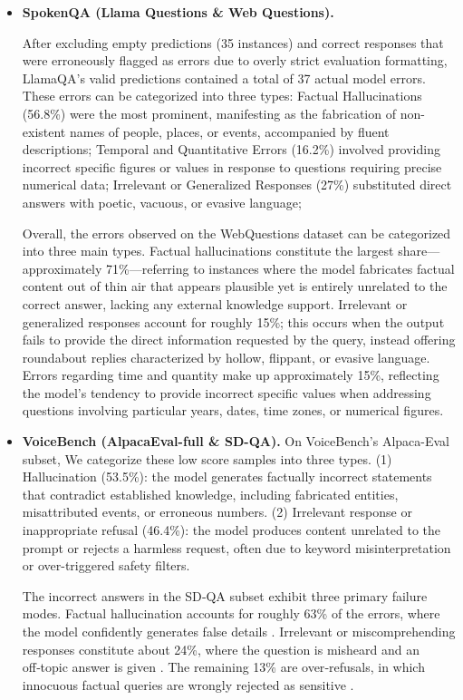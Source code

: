 \documentclass{llmxive}
\begin{document}
\begin{itemize}[leftmargin=0.5em,label=\textbullet,itemsep=0.35em,topsep=0.35em]
    \item \textbf{SpokenQA (Llama Questions \& Web Questions).}
    
  After excluding empty predictions (35 instances) and correct responses that were erroneously flagged as errors due to overly strict evaluation formatting, LlamaQA’s valid predictions contained a total of 37 actual model errors. These errors can be categorized into three types: Factual Hallucinations (56.8\%) were the most prominent, manifesting as the fabrication of non-existent names of people, places, or events, accompanied by fluent descriptions; Temporal and Quantitative Errors (16.2\%) involved providing incorrect specific figures or values in response to questions requiring precise numerical data; Irrelevant or Generalized Responses (27\%) substituted direct answers with poetic, vacuous, or evasive language; 

  Overall, the errors observed on the WebQuestions dataset can be categorized into three main types.
  Factual hallucinations constitute the largest share—approximately 71\%—referring to instances where the model fabricates factual content out of thin air that appears plausible yet is entirely unrelated to the correct answer, lacking any external knowledge support. Irrelevant or generalized responses account for roughly 15\%; this occurs when the output fails to provide the direct information requested by the query, instead offering roundabout replies characterized by hollow, flippant, or evasive language. Errors regarding time and quantity make up approximately 15\%, reflecting the model's tendency to provide incorrect specific values when addressing questions involving particular years, dates, time zones, or numerical figures.
   

  

    \item \textbf{VoiceBench (AlpacaEval-full \& SD-QA).}
  On VoiceBench's Alpaca-Eval subset, We categorize these low score samples into three types. (1) Hallucination (53.5\%): the model generates factually incorrect statements that contradict established knowledge, including fabricated entities, misattributed events, or erroneous numbers. (2) Irrelevant response or inappropriate refusal (46.4\%): the model produces content unrelated to the prompt or rejects a harmless request, often due to keyword misinterpretation or over-triggered safety filters. 
  
  The  incorrect answers in the SD‑QA subset exhibit three primary failure modes. Factual hallucination accounts for roughly 63\% of the errors, where the model confidently generates false details . Irrelevant or miscomprehending responses constitute about 24\%, where the question is misheard and an off‑topic answer is given . The remaining 13\% are over‑refusals, in which innocuous factual queries are wrongly rejected as sensitive .



\end{itemize}
\end{document}
